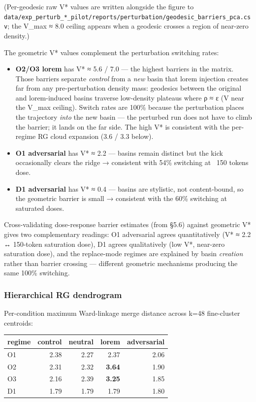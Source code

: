 \documentclass{article}
\theoremstyle{plain}
\theoremstyle{definition}
\begin{document}
(Per-geodesic raw V* values are written alongside the figure to
\texttt{data/exp\_perturb\_*\_pilot/reports/perturbation/geodesic\_barriers\_pca.csv};
the V\_max ≈ 8.0 ceiling appears when a geodesic crosses a region of
near-zero density.)

The geometric V* values complement the perturbation switching rates:

\begin{itemize}
  \item \textbf{O2/O3 lorem} has V* ≈ 5.6 / 7.0 — the highest barriers in the
  matrix. Those barriers separate \textit{control} from a \textit{new} basin that
  lorem injection creates far from any pre-perturbation density
  mass: geodesics between the original and lorem-induced basins
  traverse low-density plateaus where ρ ≈ ε (V near the V\_max
  ceiling). Switch rates are 100\% because the perturbation places
  the trajectory \textit{into} the new basin — the perturbed run does not
  have to climb the barrier; it lands on the far side. The high V*
  is consistent with the per-regime RG cloud expansion (3.6 / 3.3
  below).
  \item \textbf{O1 adversarial} has V* ≈ 2.2 — basins remain distinct but the kick
  occasionally clears the ridge → consistent with 54\% switching at
  ~150 tokens dose.
  \item \textbf{D1 adversarial} has V* ≈ 0.4 — basins are stylistic, not
  content-bound, so the geometric barrier is small → consistent with
  the 60\% switching at saturated doses.
\end{itemize}

Cross-validating dose-response barrier estimates (from §5.6) against
geometric V* gives two complementary readings: O1 adversarial agrees
quantitatively (V* ≈ 2.2 ↔ 150-token saturation dose), D1 agrees
qualitatively (low V*, near-zero saturation dose), and the
replace-mode regimes are explained by basin \textit{creation} rather than
barrier crossing — different geometric mechanisms producing the same
100\% switching.

\subsubsection{Hierarchical RG dendrogram}

Per-condition maximum Ward-linkage merge distance across k=48 fine-cluster
centroids:

\begin{table}[h!]
\centering
\small
\begin{tabular}{lrrrr}
\toprule
regime & control & neutral & lorem & adversarial \\
\midrule
O1 & 2.38 & 2.27 & 2.37 & 2.06 \\
O2 & 2.31 & 2.32 & \textbf{3.64} & 1.90 \\
O3 & 2.16 & 2.39 & \textbf{3.25} & 1.85 \\
D1 & 1.79 & 1.79 & 1.79 & 1.80 \\
\bottomrule
\end{tabular}
\end{table}
\end{document}
